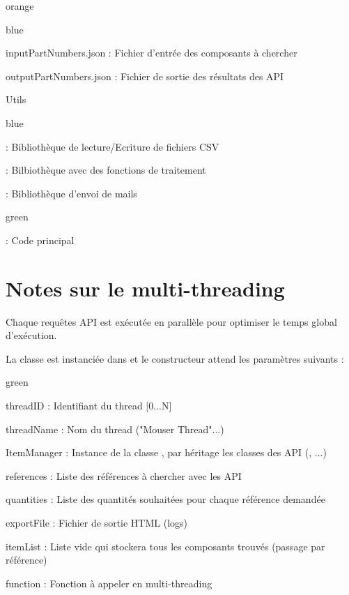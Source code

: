 {\begin{items}{orange}{\Triangle}
\begin{items}{blue}{\Triangle}
\item inputPartNumbers.json : Fichier d'entrée des composants à chercher
\item outputPartNumbers.json : Fichier de sortie des résultats des API
\end{items}
\item Utils
\begin{items}{blue}{\Triangle}
\item {} : Bibliothèque de lecture/Ecriture de fichiers CSV
\item {} : Bilbiothèque avec des fonctions de traitement
\item {} : Bibliothèque d'envoi de mails
\end{items}
\end{items}
\begin{items}{green}{\Triangle}
\item {} : Code principal

\end{items}


\section{Notes sur le multi-threading} 

Chaque \label{multithrading} requêtes API est exécutée en parallèle pour optimiser le temps global d'exécution.

La classe  est instanciée dans  et le constructeur attend les paramètres suivants : 
\begin{items}{green}{\Triangle}
\item threadID : Identifiant du thread [0...N]
\item threadName : Nom du thread ("Mouser Thread"...)
\item ItemManager : Instance de la classe , par héritage les classes des API (, ...)
\item references : Liste des références à chercher avec les API
\item quantities : Liste des quantités souhaitées pour chaque référence demandée
\item exportFile : Fichier de sortie HTML (logs)
\item itemList : Liste vide qui stockera tous les composants trouvés (passage par référence)
\item function : Fonction à appeler en multi-threading
\end{items}

}
